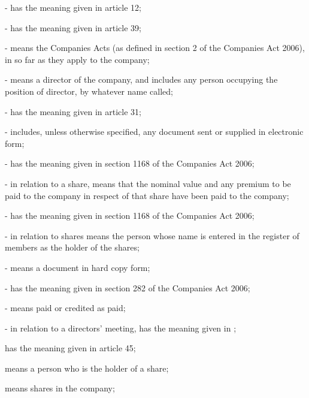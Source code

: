 \documentclass[letterpaper,10pt,openany,oneside,english]{sphinxmanual}
\begin{document}
 - has the meaning given in article 12;

 - has the meaning given in article 39;

 - means the Companies Acts (as defined in section 2 of the Companies Act 2006), in so far as they apply to the company;

 - means a director of the company, and includes any person occupying the position of director, by whatever name called;

 - has the meaning given in article 31;

 - includes, unless otherwise specified, any document sent or supplied in electronic form;

 - has the meaning given in section 1168 of the Companies Act 2006;

 - in relation to a share, means that the nominal value and any premium to be paid to the company in respect of that share have been paid to the company;

 - has the meaning given in section 1168 of the Companies Act 2006;

 - in relation to shares means the person whose name is entered in the register of members as the holder of the shares;

 - means a document in hard copy form;

 - has the meaning given in section 282 of the Companies Act 2006;

 - means paid or credited as paid;

 - in relation to a directors’ meeting, has the meaning given in {\hyperref[\detokenize{directors:article-10}]{}};

 has the meaning given in article 45;

 means a person who is the holder of a share;

 means shares in the company;
\end{document}
